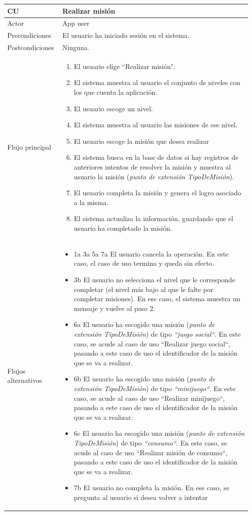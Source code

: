 \documentclass[twoside]{report}
\newcommand\addrow[2]{#1 &#2\\ }
\newcommand\addheading[2]{#1 &#2\\ \hline}
\newcommand\tabularhead{\begin{tabular}{lp{0.7\textwidth}}
\hline
}
\newenvironment{usecase}{\tabularhead}
{\hline\end{tabular}}
\begin{document}
\begin{usecase}
  \addheading{\textbf{CU\arabic{usecase}}}{Realizar misión} 
  \addrow{Actor}{App user}
  \addrow{Precondiciones}{El usuario ha iniciado sesión en el sistema.}
  \addrow{Postcondiciones}{Ninguna.}
  \addrow{Flujo principal}{
  		\begin{enumerate}
  		\item El usuario elige “Realizar misión". %
  		\item El sistema muestra al usuario el conjunto de niveles con los que cuenta la aplicación. %
  		\item El usuario escoge un nivel. %
  		\item El sistema muestra al usuario las misiones de ese nivel. %
  		\item El usuario escoge la misión que desea realizar %
  		\item El sistema busca en la base de datos si hay registros de anteriores intentos de resolver la misión y muestra al usuario la misión (\textit{punto de extensión TipoDeMisión}). %
  		\item El usuario completa la misión y genera el logro asociado a la misma.%
  		\item El sistema actualiza la información, guardando que el usuario ha completado la misión. %
  		\end{enumerate}
  }
  \addrow{Flujos alternativos}{
  		\begin{itemize}
  		\item 1a 3a 5a 7a El usuario cancela la operación. En este caso, el caso de uso termina y queda sin efecto.
        \item 3b El usuario no selecciona el nivel que le corresponde completar (el nivel más bajo al que le falte por completar misiones). En ese caso, el sistema muestra un mensaje y vuelve al paso 2.
        
        \item 6a El usuario ha escogido una misión (\textit{punto de extensión TipoDeMisión}) de tipo \textit{“juego social“}. En este caso, se acude al caso de uso “Realizar juego social“, pasando a este caso de uso el identificador de la misión que se va a realizar.
        
        \item 6b El usuario ha escogido una misión (\textit{punto de extensión TipoDeMisión}) de tipo \textit{“minijuego“}. En este caso, se acude al caso de uso “Realizar minijuego“, pasando a este caso de uso el identificador de la misión que se va a realizar.
        
        \item 6c El usuario ha escogido una misión (\textit{punto de extensión TipoDeMisión}) de tipo \textit{“consumo“}. En este caso, se acude al caso de uso “Realizar misión de consumo“, pasando a este caso de uso el identificador de la misión que se va a realizar.
        
        \item 7b El usuario no completa la misión. En ese caso, se pregunta al usuario si desea volver a intentar
  		\end{itemize}
  }
\end{usecase}\\
\end{document}
